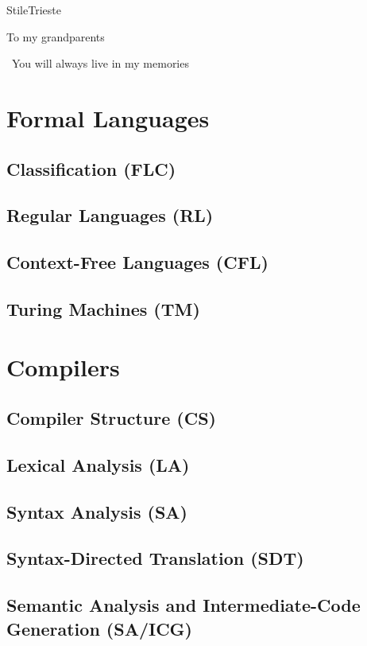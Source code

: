 \documentclass[pdfa,cucitura]{toptesi}
\begin{document}
\english


\expandafter\ifx\csname StileTrieste\endcsname\relax
\else
	\paginavuota
	\begin{dedica}
		To my grandparents

		\textdagger\ You will always live in my memories
	\end{dedica}
	\tomo
\fi

\sommario


\indici

\mainmatter

\part{Formal Languages}

\chapter{Classification (FLC)}


\chapter{Regular Languages (RL)}


\chapter{Context-Free Languages (CFL)}


\chapter{Turing Machines (TM)}

\part{Compilers}

\chapter{Compiler Structure (CS)}

\chapter{Lexical Analysis (LA)}

\chapter{Syntax Analysis (SA)}

\chapter{Syntax-Directed Translation (SDT)}

\chapter{Semantic Analysis and Intermediate-Code Generation (SA/ICG)}
\end{document}
